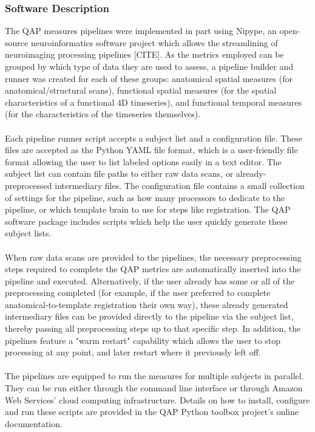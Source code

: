 \subsubsection{Software Description}
\label{sec:20}
The QAP measures pipelines were implemented in part using Nipype, an open-source neuroinformatics software project which allows the streamlining of neuroimaging processing pipelines [CITE]. As the metrics employed can be grouped by which type of data they are used to assess, a pipeline builder and runner was created for each of these groups: anatomical spatial measures (for anatomical/structural scans), functional spatial measures (for the spatial characteristics of a functional 4D timeseries), and functional temporal measures (for the characteristics of the timeseries themselves).
\\\\
Each pipeline runner script accepts a subject list and a configuration file. These files are accepted as the Python YAML file format, which is a user-friendly file format allowing the user to list labeled options easily in a text editor. The subject list can contain file paths to either raw data scans, or already-preprocessed intermediary files. The configuration file contains a small collection of settings for the pipeline, such as how many processors to dedicate to the pipeline, or which template brain to use for steps like registration. The QAP software package includes scripts which help the user quickly generate these subject lists.
\\\\
When raw data scans are provided to the pipelines, the necessary preprocessing steps required to complete the QAP metrics are automatically inserted into the pipeline and executed. Alternatively, if the user already has some or all of the preprocessing completed (for example, if the user preferred to complete anatomical-to-template registration their own way), these already generated intermediary files can be provided directly to the pipeline via the subject list, thereby passing all preprocessing steps up to that specific step. In addition, the pipelines feature a "warm restart" capability which allows the user to stop processing at any point, and later restart where it previously left off.
\\\\
The pipelines are equipped to run the measures for multiple subjects in parallel. They can be run either through the command line interface or through Amazon Web Services' cloud computing infrastructure. Details on how to install, configure and run these scripts are provided in the QAP Python toolbox project’s online documentation.
